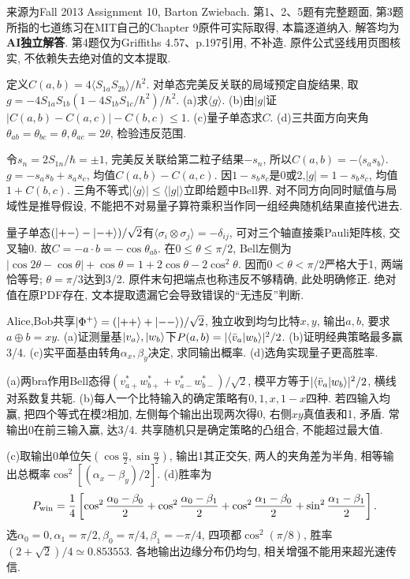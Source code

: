 来源为Fall 2013 Assignment 10, Barton Zwiebach. 第1、2、5题有完整题面, 第3题所指的七道练习在MIT自己的Chapter 9原件可实际取得, 本篇逐道纳入. 解答均为\textbf{AI独立解答}. 第4题仅为Griffiths 4.57、p.197引用, 不补造. 原件公式竖线用页图核实, 不依赖失去绝对值的文本提取.
\begin{exercise}
定义$C(a,b)=4\langle S_{1a}S_{2b}\rangle/\hbar^2$. 对单态完美反关联的局域预定自旋结果, 取$g=-4S_{1a}S_{1b}(1-4S_{1b}S_{1c}/\hbar^2)/\hbar^2$. (a)求$\langle g\rangle$. (b)由$|g|$证$|C(a,b)-C(a,c)|-C(b,c)\le1$. (c)量子单态求$C$. (d)三共面方向夹角$\theta_{ab}=\theta_{bc}=\theta,\theta_{ac}=2\theta$, 检验违反范围.
\end{exercise}
\begin{solution}
令$s_n=2S_{1n}/\hbar=\pm1$, 完美反关联给第二粒子结果$-s_n$, 所以$C(a,b)=-\langle s_as_b\rangle$. $g=-s_as_b+s_as_c$, 均值$C(a,b)-C(a,c)$. 因$1-s_bs_c$是0或2,$|g|=1-s_bs_c$, 均值$1+C(b,c)$. 三角不等式$|\langle g\rangle|\le\langle|g|\rangle$立即给题中Bell界. 对不同方向同时赋值与局域性是推导假设, 不能把不对易量子算符乘积当作同一组经典随机结果直接代进去.

量子单态$(\lvert +-\rangle-\lvert -+\rangle)/\sqrt2$有$\langle\sigma_i\otimes\sigma_j\rangle=-\delta_{ij}$, 可对三个轴直接乘Pauli矩阵核, 交叉轴0. 故$C=-a\cdot b=-\cos\theta_{ab}$. 在$0\le\theta\le\pi/2$, Bell左侧为$|\cos2\theta-\cos\theta|+\cos\theta=1+2\cos\theta-2\cos^2\theta$. 因而$0<\theta<\pi/2$严格大于1, 两端恰等号; $\theta=\pi/3$达到3/2. 原件末句把端点也称违反不够精确, 此处明确修正. 绝对值在原PDF存在, 文本提取遗漏它会导致错误的“无违反”判断.

\end{solution}
\begin{exercise}
Alice,Bob共享$\lvert \Phi^+\rangle=(\lvert ++\rangle+\lvert --\rangle)/\sqrt2$, 独立收到均匀比特$x,y$, 输出$a,b$, 要求$a\oplus b=xy$. (a)证测量基$\lvert v_a\rangle,\lvert w_b\rangle$下$P(a,b)=|\langle \bar v_a\vert w_b\rangle|^2/2$. (b)证明经典策略最多赢3/4. (c)实平面基由转角$\alpha_x,\beta_y$决定, 求同输出概率. (d)选角实现量子更高胜率.
\end{exercise}
\begin{solution}
(a)两bra作用Bell态得$(v_{a+}^*w_{b+}^*+v_{a-}^*w_{b-}^*)/\sqrt2$, 模平方等于$|\langle \bar v_a\vert w_b\rangle|^2/2$, 横线对系数复共轭. (b)每人一个比特输入的确定策略有$0,1,x,1-x$四种. 若四输入均赢, 把四个等式在模2相加, 左侧每个输出出现两次得0, 右侧$xy$真值表和1, 矛盾. 常输出0在前三输入赢, 达3/4. 共享随机只是确定策略的凸组合, 不能超过最大值.

(c)取输出0单位矢$(\cos\frac\alpha2,\sin\frac\alpha2)$, 输出1其正交矢, 两人的夹角差为半角, 相等输出总概率$\cos^2[(\alpha_x-\beta_y)/2]$. (d)胜率为
\[
P_{\rm win}=\frac14\left[\cos^2\frac{\alpha_0-\beta_0}2+
\cos^2\frac{\alpha_0-\beta_1}2+
\cos^2\frac{\alpha_1-\beta_0}2+
\sin^2\frac{\alpha_1-\beta_1}2\right].
\]
选$\alpha_0=0,\alpha_1=\pi/2,\beta_0=\pi/4,\beta_1=-\pi/4$, 四项都$\cos^2(\pi/8)$, 胜率$(2+\sqrt2)/4\simeq0.853553$. 各地输出边缘分布仍均匀, 相关增强不能用来超光速传信.
\end{solution}
